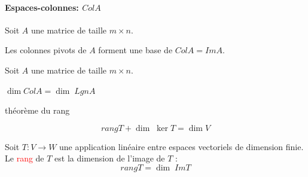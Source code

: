 \paragraph{Espaces-colonnes: $ColA$}
Soit $A$ une matrice de taille $m \times n$.
\begin{theoreme}
    Les colonnes pivots de $A$ forment une base de $ColA = Im A$.
\end{theoreme}
Soit $A$ une matrice de taille $m \times n$.
\begin{theoreme}

    $\dim ColA = \dim\; LgnA$

\end{theoreme}
\begin{theoreme}{théorème du rang}
    
        \[rangT + \dim\; \ker T  = \dim V\]
    
\end{theoreme}
\begin{definition}
Soit $T : V \to W$ une application linéaire entre espaces vectoriels de dimension finie.
\\
Le \textcolor{red}{rang} de $T$ est la dimension de l'image de $T$ : 
\[rang T = \dim \; ImT\]
\end{definition}

